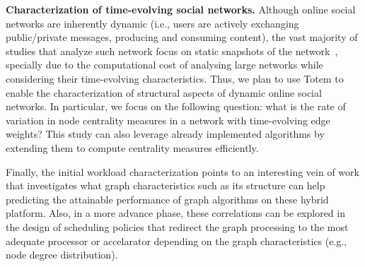 {\bf Characterization of time-evolving social networks.} Although online social networks are inherently dynamic (i.e., users are actively exchanging public/private messages, producing and consuming content), the vast majority of studies that analyze such network focus on static snapshots of the network~\cite{Willinger2009}, specially due to the computational cost of analysing large networks while considering their time-evolving characteristics. Thus, we plan to use {\sc Totem} to enable the characterization of structural aspects of dynamic online social networks. In particular, we focus on the following question: what is the rate of variation in node centrality measures in a network with time-evolving edge weights? This study can also leverage already implemented algorithms by extending them to compute centrality measures efficiently.

Finally, the initial workload characterization points to an interesting vein of work that investigates what graph characteristics such as its structure can help predicting the attainable performance of graph algorithms on these hybrid platform. Also, in a more advance phase, these correlations can be explored in the design of scheduling policies that redirect the graph processing to the most adequate processor or accelarator depending on the graph characteristics (e.g., node degree distribution).
